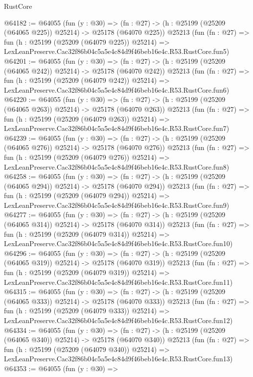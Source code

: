 \begin{lexlean}{RustCore}
\begin{coremodule}
@64182 := @64055
    (fun (y : @30) =>
    (fn : @27) -> (h : @25199 (@25209 (@64065 @225)) @25214) -> @25178 (@64070 @225))
    @25213
    (fun (fn : @27) =>
    fun (h : @25199 (@25209 (@64079 @225)) @25214) =>
    LexLeanPreserve.Cac32f86b04c5a5e4c84d9f46beb16e4c.R53.RustCore.fun5)
@64201 := @64055
    (fun (y : @30) =>
    (fn : @27) -> (h : @25199 (@25209 (@64065 @242)) @25214) -> @25178 (@64070 @242))
    @25213
    (fun (fn : @27) =>
    fun (h : @25199 (@25209 (@64079 @242)) @25214) =>
    LexLeanPreserve.Cac32f86b04c5a5e4c84d9f46beb16e4c.R53.RustCore.fun6)
@64220 := @64055
    (fun (y : @30) =>
    (fn : @27) -> (h : @25199 (@25209 (@64065 @263)) @25214) -> @25178 (@64070 @263))
    @25213
    (fun (fn : @27) =>
    fun (h : @25199 (@25209 (@64079 @263)) @25214) =>
    LexLeanPreserve.Cac32f86b04c5a5e4c84d9f46beb16e4c.R53.RustCore.fun7)
@64239 := @64055
    (fun (y : @30) =>
    (fn : @27) -> (h : @25199 (@25209 (@64065 @276)) @25214) -> @25178 (@64070 @276))
    @25213
    (fun (fn : @27) =>
    fun (h : @25199 (@25209 (@64079 @276)) @25214) =>
    LexLeanPreserve.Cac32f86b04c5a5e4c84d9f46beb16e4c.R53.RustCore.fun8)
@64258 := @64055
    (fun (y : @30) =>
    (fn : @27) -> (h : @25199 (@25209 (@64065 @294)) @25214) -> @25178 (@64070 @294))
    @25213
    (fun (fn : @27) =>
    fun (h : @25199 (@25209 (@64079 @294)) @25214) =>
    LexLeanPreserve.Cac32f86b04c5a5e4c84d9f46beb16e4c.R53.RustCore.fun9)
@64277 := @64055
    (fun (y : @30) =>
    (fn : @27) -> (h : @25199 (@25209 (@64065 @314)) @25214) -> @25178 (@64070 @314))
    @25213
    (fun (fn : @27) =>
    fun (h : @25199 (@25209 (@64079 @314)) @25214) =>
    LexLeanPreserve.Cac32f86b04c5a5e4c84d9f46beb16e4c.R53.RustCore.fun10)
@64296 := @64055
    (fun (y : @30) =>
    (fn : @27) -> (h : @25199 (@25209 (@64065 @319)) @25214) -> @25178 (@64070 @319))
    @25213
    (fun (fn : @27) =>
    fun (h : @25199 (@25209 (@64079 @319)) @25214) =>
    LexLeanPreserve.Cac32f86b04c5a5e4c84d9f46beb16e4c.R53.RustCore.fun11)
@64315 := @64055
    (fun (y : @30) =>
    (fn : @27) -> (h : @25199 (@25209 (@64065 @333)) @25214) -> @25178 (@64070 @333))
    @25213
    (fun (fn : @27) =>
    fun (h : @25199 (@25209 (@64079 @333)) @25214) =>
    LexLeanPreserve.Cac32f86b04c5a5e4c84d9f46beb16e4c.R53.RustCore.fun12)
@64334 := @64055
    (fun (y : @30) =>
    (fn : @27) -> (h : @25199 (@25209 (@64065 @340)) @25214) -> @25178 (@64070 @340))
    @25213
    (fun (fn : @27) =>
    fun (h : @25199 (@25209 (@64079 @340)) @25214) =>
    LexLeanPreserve.Cac32f86b04c5a5e4c84d9f46beb16e4c.R53.RustCore.fun13)
@64353 := @64055
    (fun (y : @30) =>

\end{coremodule}
\end{lexlean}
